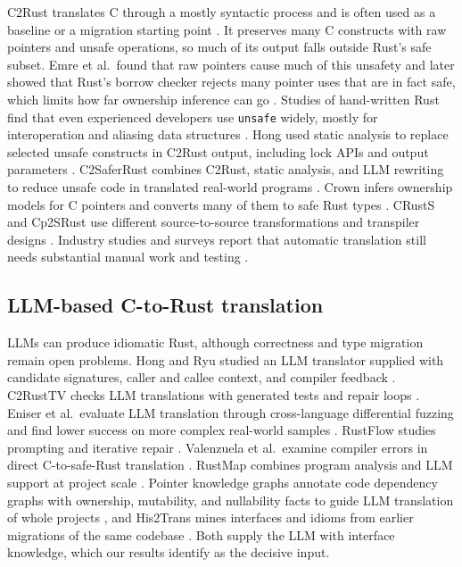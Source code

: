 \documentclass[pdflatex,sn-basic]{sn-jnl}
\begin{document}
C2Rust translates C through a mostly syntactic process and is often used as a
baseline or a migration starting point \citep{c2rust}. It preserves many C
constructs with raw pointers and unsafe operations, so much of its output falls
outside Rust's safe subset. Emre et al.\ found that raw pointers cause much of
this unsafety \citep{emre2021safer} and later showed that Rust's borrow checker
rejects many pointer uses that are in fact safe, which limits how far
ownership inference can go \citep{emre2023aliasing}. Studies of hand-written
Rust find that even experienced developers use \texttt{unsafe} widely,
mostly for interoperation and aliasing data structures
\citep{astrauskas2020unsafe}. Hong used static analysis to replace
selected unsafe constructs in C2Rust output, including lock APIs and output
parameters \citep{hong2023static}. C2SaferRust combines C2Rust, static
analysis, and LLM rewriting to reduce unsafe code in translated real-world
programs \citep{nitin2026c2saferrust}. Crown infers ownership models for C
pointers and converts many of them to safe Rust types
\citep{zhang2023ownership}. CRustS and Cp2SRust use different source-to-source
transformations and transpiler designs
\citep{ling2022trust,mohapatra2026cp2srust}. Industry studies and surveys report
that automatic translation still needs substantial manual work and testing
\citep{hong2025cacm,viirola2026feasible}.

\subsection{LLM-based C-to-Rust translation}

LLMs can produce idiomatic Rust, although correctness and type migration remain
open problems. Hong and Ryu studied an LLM translator supplied with candidate
signatures, caller and callee context, and compiler feedback
\citep{hong2025typemigrating}. C2RustTV checks LLM translations with generated
tests and repair loops \citep{zhou2025c2rusttv}. Eniser et al.\ evaluate LLM
translation through cross-language differential fuzzing and find lower success
on more complex real-world samples \citep{eniser2025fluorine}. RustFlow studies
prompting and iterative repair \citep{zhang2026rustflow}. Valenzuela et al.\
examine compiler errors in direct C-to-safe-Rust translation
\citep{valenzuela2026llmcompile}. RustMap combines program analysis and LLM
support at project scale \citep{cai2025rustmap}. Pointer knowledge graphs
annotate code dependency graphs with ownership, mutability, and nullability
facts to guide LLM translation of whole projects \citep{yuan2026pkg}, and
His2Trans mines interfaces and idioms from earlier migrations of the same
codebase \citep{wang2026his2trans}. Both supply the LLM with interface
knowledge, which our results identify as the decisive input.
\end{document}

